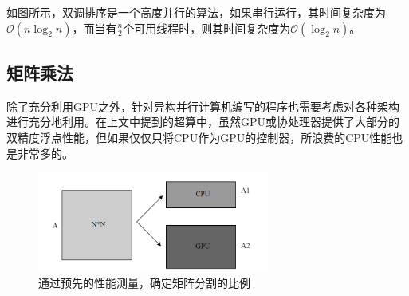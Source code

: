\documentclass[UTF8,a4paper,10pt]{ctexart}
\makeatletter
\newenvironment{breakablealgorithm}
  {%
  \begin{center}
     \refstepcounter{algorithm}%
     \hrule height.8pt depth0pt \kern2pt%
     \renewcommand{\caption}[2][\relax]{%
      {\raggedright\textbf{\ALG@name~\thealgorithm} ##2\par}%
      \ifx\relax##1\relax %
         \addcontentsline{loa}{algorithm}{\protect\numberline{\thealgorithm}##2}%
      \else %
         \addcontentsline{loa}{algorithm}{\protect\numberline{\thealgorithm}##1}%
      \fi
      \kern2pt\hrule\kern2pt
     }
  }{%
     \kern2pt\hrule\relax%
  \end{center}
  }
\makeatother
\begin{document}
如图所示，双调排序是一个高度并行的算法，如果串行运行，其时间复杂度为$\mathcal{O}(n\log_{2}{n})$，而当有$\frac{n}{2}$个可用线程时，则其时间复杂度为$\mathcal{O}(\log_{2}{n})$。\cite{bitonic_wiki}






\subsection{矩阵乘法}

除了充分利用GPU之外，针对异构并行计算机编写的程序也需要考虑对各种架构进行充分地利用。在上文中提到的超算中，虽然GPU或协处理器提供了大部分的双精度浮点性能，但如果仅仅只将CPU作为GPU的控制器，所浪费的CPU性能也是非常多的。
~
\begin{figure}[!htbp]
    \centering
    \includegraphics[width=3in]{fig/matrix_divide.png}
    \caption{通过预先的性能测量，确定矩阵分割的比例\cite{gpu_martix}}
    \label{fig:matrix_divide}
\end{figure}
\end{document}
